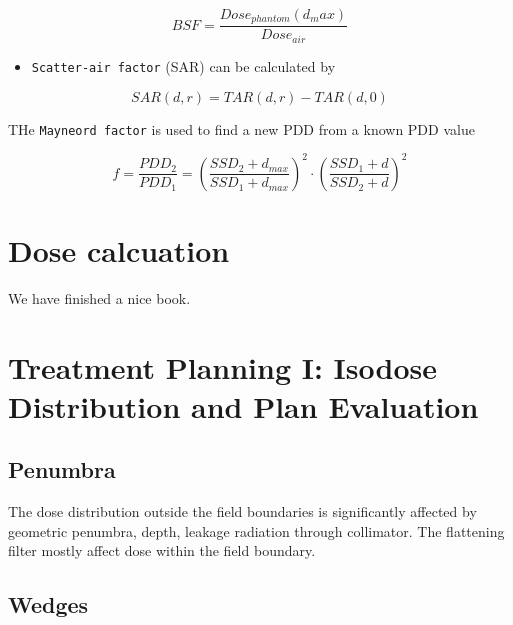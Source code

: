 \documentclass[]{book}
\providecommand{\tightlist}{%
  \setlength{\itemsep}{0pt}\setlength{\parskip}{0pt}}
\theoremstyle{definition}
\theoremstyle{definition}
\theoremstyle{definition}
\theoremstyle{remark}
\begin{document}
\begin{equation}
  BSF = \frac{Dose_{phantom}(d_max)}{Dose_{air}}
  \label{eq:bsf}
\end{equation}

\begin{itemize}
\tightlist
\item
  \texttt{Scatter-air\ factor} (SAR) can be calculated by
\end{itemize}

\begin{equation}
  SAR(d,r) = TAR(d,r)-TAR(d,0)
  \label{eq:sar}
\end{equation}

THe \texttt{Mayneord\ factor} is used to find a new PDD from a known PDD
value

\begin{equation}
  f = \frac{PDD_2}{PDD_1} =\left( \frac{SSD_2+d_{max}}{SSD_1+d_{max}} \right)^2  \cdot \left( \frac{SSD_1+d}{SSD_2+d} \right)^2  
  \label{eq:mayneord}
\end{equation}

\chapter{Dose calcuation}\label{dosecalc}

We have finished a nice book.

\chapter{Treatment Planning I: Isodose Distribution and Plan
Evaluation}\label{planning1}

\section{Penumbra}\label{penumbra-1}

The dose distribution outside the field boundaries is significantly
affected by geometric penumbra, depth, leakage radiation through
collimator. The flattening filter mostly affect dose within the field
boundary.

\section{Wedges}\label{wedges}
\end{document}
